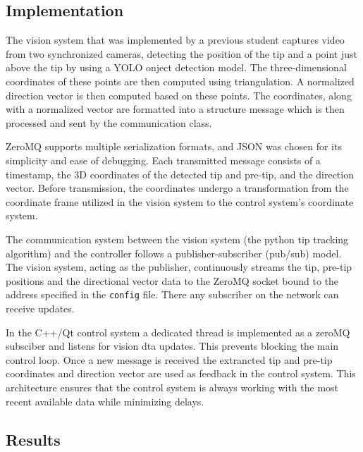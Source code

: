 \subsection{Implementation}

The vision system that was implemented by a previous student  captures video from two synchronized cameras, detecting the position of the tip and a point just above   the tip by using a YOLO onject detection model. The three-dimensional coordinates of these points are then computed using triangulation. A normalized direction vector is then computed based on these points. The coordinates, along with a normalized vector are formatted into a structure message which is then processed and sent by the communication class. 


ZeroMQ supports multiple serialization formats, and JSON was chosen for its simplicity and ease of debugging. Each transmitted message consists of a timestamp, the 3D coordinates of the detected tip and pre-tip, and the direction vector. Before transmission, the coordinates undergo a transformation from the coordinate frame utilized in the vision system to the control system's coordinate system. 

The communication system between the vision system (the python tip tracking algorithm) and the controller follows a publisher-subscriber (pub/sub) model. The vision system, acting as the publisher, continuously streams the tip, pre-tip positions and the directional vector data to the ZeroMQ socket bound to the address specified in the \texttt{config} file. There any subscriber on the network can receive updates. 

In the C++/Qt control system a dedicated thread is implemented as a zeroMQ subsciber and listens for vision dta updates. This prevents blocking the main control loop. Once a new message is received the extrancted tip and pre-tip coordinates and direction vector are used as feedback in the control system. This architecture ensures that the control system is always working with the most recent available data while minimizing delays.

\subsection{Results}

